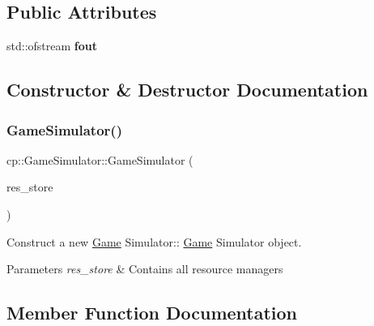 \subsection*{Public Attributes}
\begin{DoxyCompactItemize}
\item 
\mbox{\label{classcp_1_1_game_simulator_a99927634c5bc41cdf6c690706bb5c848}} 
std\+::ofstream {\bfseries fout}
\end{DoxyCompactItemize}


\subsection{Constructor \& Destructor Documentation}
\mbox{\label{classcp_1_1_game_simulator_a5f1df55a988bcd5aa19dc37a3f2f64f8}} 
\subsubsection{\texorpdfstring{Game\+Simulator()}{GameSimulator()}}
{\footnotesize\ttfamily cp\+::\+Game\+Simulator\+::\+Game\+Simulator (\begin{DoxyParamCaption}\item[{Game\+Data\+Ref}]{res\+\_\+store }\end{DoxyParamCaption})}



Construct a new \hyperlink{classcp_1_1_game}{Game} Simulator\+:\+: \hyperlink{classcp_1_1_game}{Game} Simulator object. 


\begin{DoxyParams}{Parameters}
{\em res\+\_\+store} & Contains all resource managers \\
\hline
\end{DoxyParams}


\subsection{Member Function Documentation}
\mbox{\label{classcp_1_1_game_simulator_ae06e0ba47d8d535f462c072daaae16e4}} 
